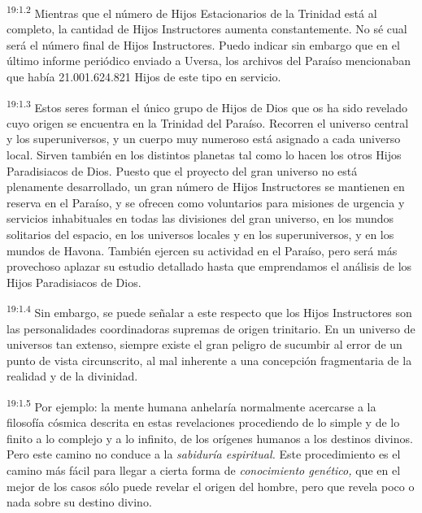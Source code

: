 \par
\textsuperscript{19:1.2} Mientras que el número de Hijos Estacionarios de la Trinidad está al completo, la cantidad de Hijos Instructores aumenta constantemente. No sé cual será el número final de Hijos Instructores. Puedo indicar sin embargo que en el último informe periódico enviado a Uversa, los archivos del Paraíso mencionaban que había 21.001.624.821 Hijos de este tipo en servicio.

\par
\textsuperscript{19:1.3} Estos seres forman el único grupo de Hijos de Dios que os ha sido revelado cuyo origen se encuentra en la Trinidad del Paraíso. Recorren el universo central y los superuniversos, y un cuerpo muy numeroso está asignado a cada universo local. Sirven también en los distintos planetas tal como lo hacen los otros Hijos Paradisiacos de Dios. Puesto que el proyecto del gran universo no está plenamente desarrollado, un gran número de Hijos Instructores se mantienen en reserva en el Paraíso, y se ofrecen como voluntarios para misiones de urgencia y servicios inhabituales en todas las divisiones del gran universo, en los mundos solitarios del espacio, en los universos locales y en los superuniversos, y en los mundos de Havona. También ejercen su actividad en el Paraíso, pero será más provechoso aplazar su estudio detallado hasta que emprendamos el análisis de los Hijos Paradisiacos de Dios.

\par
\textsuperscript{19:1.4} Sin embargo, se puede señalar a este respecto que los Hijos Instructores son las personalidades coordinadoras supremas de origen trinitario. En un universo de universos tan extenso, siempre existe el gran peligro de sucumbir al error de un punto de vista circunscrito, al mal inherente a una concepción fragmentaria de la realidad y de la divinidad.

\par
\textsuperscript{19:1.5} Por ejemplo: la mente humana anhelaría normalmente acercarse a la filosofía cósmica descrita en estas revelaciones procediendo de lo simple y de lo finito a lo complejo y a lo infinito, de los orígenes humanos a los destinos divinos. Pero este camino no conduce a la \textit{sabiduría espiritual.} Este procedimiento es el camino más fácil para llegar a cierta forma de \textit{conocimiento genético,} que en el mejor de los casos sólo puede revelar el origen del hombre, pero que revela poco o nada sobre su destino divino.

